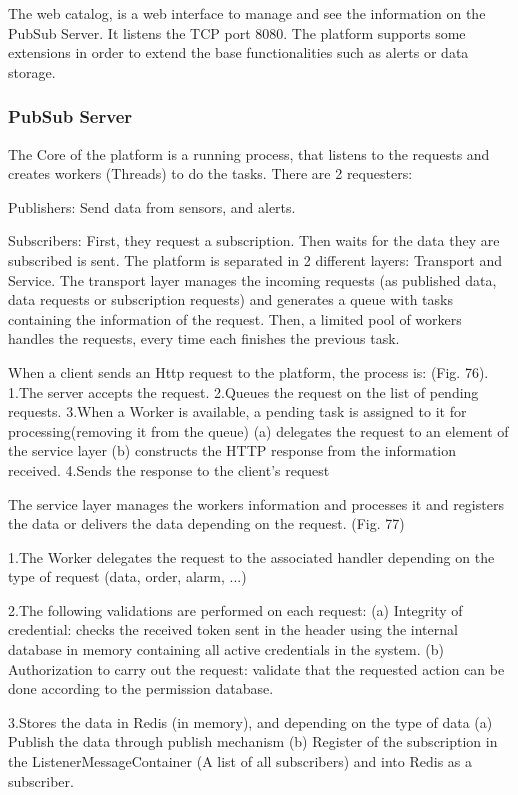 The web catalog, is a web interface to manage and see the information on the
PubSub Server. It listens the TCP port 8080.
The platform supports some extensions in order to extend the base functionalities
such as alerts or data storage.

\subsubsection{PubSub Server}

The Core of the platform is a running process,
	that listens to the requests and creates workers (Threads) to do the tasks.
There are 2 requesters:

Publishers:
	Send data from sensors,
	and alerts.

Subscribers:
	First,
	they request a subscription.
Then waits for the data they are subscribed is sent.
The platform is separated in 2 different layers:
	Transport and Service.
The transport layer manages the incoming requests (as published data,
	data requests or subscription requests) and generates a queue with tasks containing the information of the request.
Then,
	a limited pool of workers handles the requests,
	every time each finishes the previous task.

When a client sends an Http request to the platform,
	the process is:
	(Fig. 76).
1.The server accepts the request.
2.Queues the request on the list of pending requests.
3.When a Worker is available,
	a pending task is assigned to it for processing(removing it from the queue) (a) delegates the request to an element of the service layer (b) constructs the HTTP response from the information received.
4.Sends the response to the client's request 

The service layer manages the workers information and processes it and registers the data or delivers the data depending on the request. (Fig. 77) 

1.The Worker delegates the request to the associated handler depending on the type of request (data,
	order,
	alarm,
	...)

2.The following validations are performed on each request:
	(a) Integrity of credential:
	checks the received token sent in the header using the internal database in memory containing all active credentials in the system.
(b) Authorization to carry out the request:
	validate that the requested action can be done according to the permission database.

3.Stores the data in Redis (in memory),
	and depending on the type of data (a) Publish the data through publish mechanism (b) Register of the subscription in the ListenerMessageContainer (A list of all subscribers) and into Redis as a subscriber.


